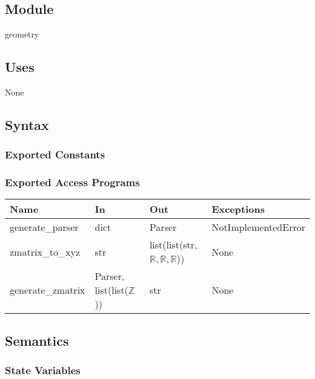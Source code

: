\documentclass[12pt, titlepage]{article}
\begin{document}
\subsection{Module}

geometry

\subsection{Uses}

None

\subsection{Syntax}

\subsubsection{Exported Constants}

\subsubsection{Exported Access Programs}

\begin{center}
	\begin{tabular}{p{2cm} p{4cm} p{4cm} p{2cm}}
		\hline
		\textbf{Name} & \textbf{In} & \textbf{Out} & \textbf{Exceptions} \\
		\hline
		generate\_parser & dict & Parser & NotImplementedError \\
		zmatrix\_to\_xyz & str & list(list(str, $\mathbb{R}, \mathbb{R}, 
		\mathbb{R}$)) & None \\
		generate\_zmatrix & Parser, list(list($\mathbb{Z}$)) & str & None \\
		\hline
	\end{tabular}
\end{center}

\subsection{Semantics}

\subsubsection{State Variables}
\end{document}
